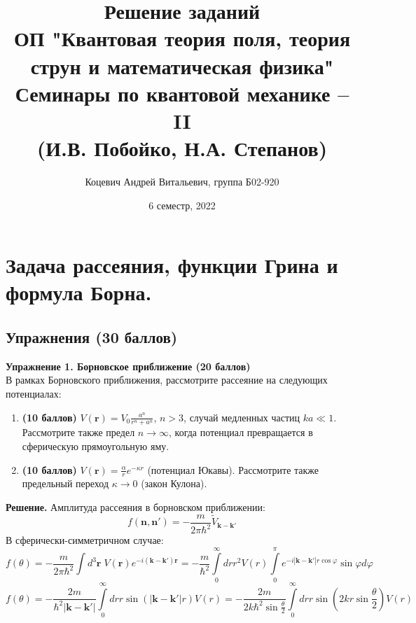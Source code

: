 \documentclass[12pt]{article}
\title{Решение заданий\\ ОП "Квантовая теория поля, теория струн и математическая физика"\\[2cm]
Семинары по квантовой механике -- II\\ (И.В. Побойко, Н.А. Степанов)}
\author{Коцевич Андрей Витальевич, группа Б02-920}
\date{6 семестр, 2022}
\theoremstyle{definition}
\begin{document}
\maketitle
\newpage
\tableofcontents{}
\newpage
\section{Задача рассеяния, функции Грина и формула Борна.}
\subsection*{Упражнения (30 баллов)}
\textbf{Упражнение 1. Борновское приближение (20 баллов)}\\
В рамках Борновского приближения, рассмотрите рассеяние на следующих потенциалах:
\begin{enumerate}
    \item \textbf{(10 баллов)} $V(\textbf{r}) = V_0\frac{a^n}{r^n+a^n}$, $n > 3$, случай медленных частиц $ka\ll1$. Рассмотрите также предел $n \rightarrow \infty$, когда потенциал превращается в сферическую прямоугольную яму.
    \item \textbf{(10 баллов)} $V(\textbf{r}) = \frac{\alpha}{r}e^{-\kappa r}$ (потенциал Юкавы). Рассмотрите также предельный переход $\kappa\rightarrow 0$ (закон Кулона).
\end{enumerate}
\textbf{Решение.}
Амплитуда рассеяния в борновском приближении:
\begin{equation}
    f(\textbf{n},\textbf{n}')=-\frac{m}{2\pi\hbar^2}\tilde{V}_{\textbf{k}-\textbf{k}'}
\end{equation}
В сферически-симметричном случае:
\begin{equation}
    f(\theta)=-\frac{m}{2\pi\hbar^2}\int d^3\textbf{r}\;V(\textbf{r})e^{-i(\textbf{k}-\textbf{k}')\textbf{r}}=-\frac{m}{\hbar^2}\int\limits_0^\infty drr^2V(r)\int\limits_0^\pi e^{-i|\textbf{k}-\textbf{k}'|r\cos\varphi}\sin\varphi d\varphi
\end{equation}
\begin{equation}
    f(\theta)=-\frac{2m}{\hbar^2|\textbf{k}-\textbf{k}'|}\int\limits_0^\infty drr\sin(|\textbf{k}-\textbf{k}'|r)V(r)=-\frac{2m}{2k\hbar^2\sin\frac{\theta}{2}}\int\limits_0^\infty drr\sin\left(2kr\sin\frac{\theta}{2}\right)V(r)
\end{equation}
\end{document}
